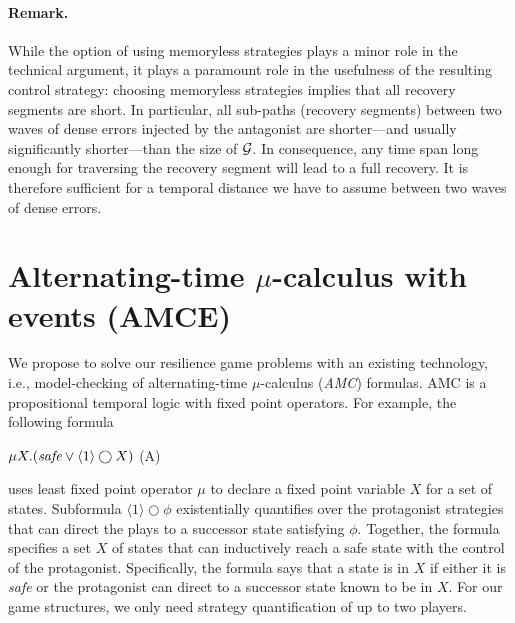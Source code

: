 \documentclass[times,10pt,twocolumn]{article}
\newcommand{\nxt}{\bigcirc}
\newcommand{\calg}{{\cal G}}
\begin{document}
\paragraph{\bf Remark.}\hspace*{-2ex}
While the option of using memoryless strategies plays a minor role in the technical argument, it plays a paramount role in the usefulness of the resulting control strategy:
choosing memoryless strategies implies that all recovery segments are short.
In particular, all sub-paths (recovery segments) between two waves of dense errors injected by the antagonist are shorter---and usually significantly shorter---than the size of $\calg$.
In consequence, any time span long enough for traversing the recovery segment will lead to a full recovery.
It is therefore sufficient for a temporal distance we have to assume between two waves of dense errors.







\section{Alternating-time $\mu$-calculus with events (AMCE)  
\label{sec.amc}
} 


We propose to solve our resilience game problems with an 
existing technology, i.e., model-checking of alternating-time $\mu$-calculus 
({\em AMC}) formulas.  
AMC is a propositional temporal logic 
with fixed point operators.  
For example, the following formula 
\begin{center} 
\hfill 
$\mu X.(\text{\em safe}\vee \langle 1\rangle \nxt X)$
\hfill (A) 
\end{center} 
uses least fixed point operator $\mu$ to declare a fixed point variable 
$X$ for a set of states. 
Subformula $\langle 1\rangle \nxt \phi$ existentially 
quantifies over 
the protagonist strategies that can direct the plays to a successor state 
satisfying $\phi$.  
Together, the formula specifies a set $X$ of states that can inductively reach a safe 
state with the control of the protagonist. 
Specifically, the formula says that a state is in $X$ if 
either it is {\em safe} 
or the protagonist can direct to a successor state known to be 
in $X$.  
For our game structures, we only need strategy quantification 
of up to two players.  
\end{document}
